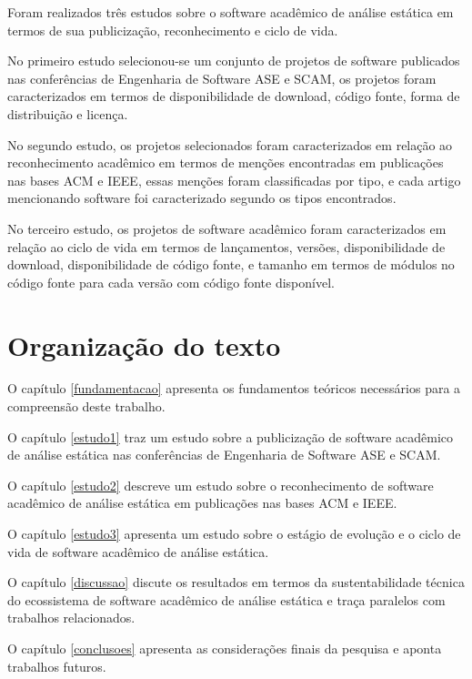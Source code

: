 Foram realizados três estudos sobre o software acadêmico de análise estática em
termos de sua publicização, reconhecimento e ciclo de vida.

No primeiro estudo selecionou-se um conjunto de projetos de software publicados
nas conferências de Engenharia de Software ASE e SCAM, os projetos foram
caracterizados em termos de disponibilidade de download, código fonte, forma de
distribuição e licença.

No segundo estudo, os projetos selecionados foram caracterizados em relação ao
reconhecimento acadêmico em termos de menções encontradas em publicações nas
bases ACM e IEEE, essas menções foram classificadas por tipo, e cada artigo
mencionando software foi caracterizado segundo os tipos encontrados.

No terceiro estudo, os projetos de software acadêmico foram caracterizados em
relação ao ciclo de vida em termos de lançamentos, versões, disponibilidade de
download, disponibilidade de código fonte, e tamanho em termos de módulos no
código fonte para cada versão com código fonte disponível.

\section{Organização do texto}

O capítulo \ref{fundamentacao} apresenta os fundamentos teóricos necessários
para a compreensão deste trabalho.

O capítulo \ref{estudo1} traz um estudo sobre a publicização de software
acadêmico de análise estática nas conferências de Engenharia de Software ASE e
SCAM.

O capítulo \ref{estudo2} descreve um estudo sobre o reconhecimento de software
acadêmico de análise estática em publicações nas bases ACM e IEEE.

O capítulo \ref{estudo3} apresenta um estudo sobre o estágio de evolução e o
ciclo de vida de software acadêmico de análise estática.

O capítulo \ref{discussao} discute os resultados em termos da sustentabilidade
técnica do ecossistema de software acadêmico de análise estática e traça
paralelos com trabalhos relacionados.

O capítulo \ref{conclusoes} apresenta as considerações finais da pesquisa e
aponta trabalhos futuros.


